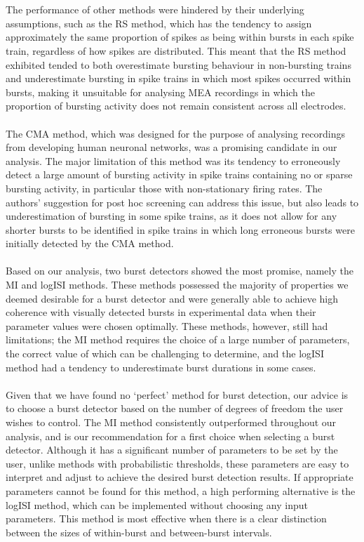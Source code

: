 \documentclass[12pt, titlepage]{article}
\begin{document}
	\\ \\The performance of other methods were hindered by their underlying assumptions, such as the RS method, which has the tendency to assign approximately the same proportion of spikes as being within bursts in each spike train, regardless of how spikes are distributed. This meant that the RS method exhibited tended to both overestimate bursting behaviour in non-bursting trains and underestimate bursting in spike trains in which most spikes occurred within bursts, making it unsuitable for analysing MEA recordings in which the proportion of bursting activity does not remain consistent across all electrodes.
	\\ \\The CMA method, which was designed for the purpose of analysing recordings from developing human neuronal networks, was a promising candidate in our analysis. The major limitation of this method was its tendency to erroneously detect a large amount of bursting activity in spike trains containing no or sparse bursting activity, in particular those with non-stationary firing rates.  The authors' suggestion for post hoc screening can address this issue, but also leads to underestimation of bursting in some spike trains, as it does not allow for any shorter bursts to be identified in spike trains in which long erroneous bursts were initially detected by the CMA method. 
	\\ \\ Based on our analysis, two burst detectors showed the most promise, namely the MI and logISI methods. These methods possessed the majority of properties we deemed desirable for a burst detector and were generally able to achieve high coherence with visually detected bursts in experimental data when their parameter values were chosen optimally. These methods, however, still had limitations; the MI method requires the choice of a large number of parameters, the correct value of which can be challenging to determine, and the logISI method had a tendency to underestimate burst durations in some cases.
	\\ \\Given that we have found no `perfect' method for burst detection, our advice is to choose a burst detector based on the number of degrees of freedom the user wishes to control.
	The MI method consistently outperformed throughout our analysis, and is our recommendation for a first choice when selecting a burst detector. Although it has a significant number of parameters to be set by the user, unlike methods with probabilistic thresholds, these parameters are easy to interpret and adjust to achieve the desired burst detection results. If appropriate parameters cannot be found for this method, a high performing alternative is the logISI method, which can be implemented without choosing any input parameters. This method is most effective when there is a clear distinction between the sizes of within-burst and between-burst intervals. 
\end{document}

